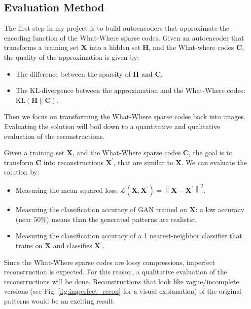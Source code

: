 \documentclass[runningheads]{llncs}
\begin{document}
\subsection{Evaluation Method}
The first step in my project is to build autoencoders that approximate the encoding function of the What-Where sparse codes.
Given an autoencoder that transforms a training set $\mathbf{X}$ into a hidden set $\mathbf{H}$, and the What-where codes $\mathbf{C}$, the quality of the approximation is given by:
\begin{itemize}
    \item The difference between the sparsity of $\mathbf{H}$ and $\mathbf{C}$.
    \item The KL-divergence between the approximation and the What-Where codes: $\mathrm{KL}\left(\mathbf{H} \| \mathbf{C}\right)$.
\end{itemize}

Then we focus on transforming the What-Where sparse codes back into images.
Evaluating the solution will boil down to a quantitative and qualitative evaluation of the reconstructions.

Given a training set $\mathbf{X}$, and the What-Where sparse codes $\mathbf{C}$, the goal is to transform $\mathbf{C}$ into reconstructions $\mathbf{X}^{\prime}$, that are similar to $\mathbf{X}$.
We can evaluate the solution by:
\begin{itemize}
    \item Measuring the mean squared loss: $\mathcal{L}\left(\mathbf{X}, \mathbf{X}^{\prime}\right)=\left\|\mathbf{X}-\mathbf{X}^{\prime}\right\|^{2}$.
    \item Measuring the classification accuracy of GAN trained on $\mathbf{X}$: a low accuracy (near $50\%$) means than the generated patterns are realistic.
    \item Measuring the classification accuracy of a 1 nearest-neighbor classifier that trains on $\mathbf{X}$ and classifies $\mathbf{X}^{\prime}$.
\end{itemize}
Since the What-Where sparse codes are lossy compressions, imperfect reconstruction is expected. For this reason, a qualitative evaluation of the reconstructions will be done. Reconstructions that look like vague/incomplete versions (see Fig. \ref{fig:imperfect_recon} for a visual explanation) of the original patterns would be an exciting result.
\end{document}
